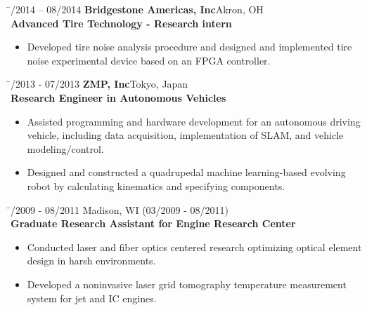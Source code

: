 \documentclass[11pt,letter]{article}
\begin{document}
\begin{tabbing}
	\hspace{3.5cm} \= /2014 -- 08/2014 \> {\bf Bridgestone Americas, Inc}\hfill{Akron, OH}\\
	\> {\bf Advanced Tire Technology - Research intern}\\
	\> \hspace{-2.5cm}\begin{minipage}{0.9\textwidth}
		\begin{itemize}
			\item Developed tire noise analysis procedure and designed and implemented tire noise experimental device based on an FPGA controller.
		\end{itemize}
	\end{minipage}
\end{tabbing}
\begin{tabbing}
	\hspace{3.5cm} \= /2013 - 07/2013 \> {\bf ZMP, Inc}\hfill{Tokyo, Japan }\\
	\> {\bf Research Engineer in Autonomous Vehicles}\\
	\> \hspace{-2.5cm} \begin{minipage}{0.9\textwidth}
		\begin{itemize}
			\item Assisted programming and hardware development for an autonomous driving vehicle, including data acquisition, implementation of SLAM, and vehicle modeling/control.
			\item Designed and constructed a quadrupedal machine learning-based evolving robot by calculating kinematics and specifying components.
		\end{itemize}
	\end{minipage}
\end{tabbing}
\begin{tabbing}
	\hspace{3.5cm} \= /2009 - 08/2011 \hfill{Madison, WI}{ (03/2009 - 08/2011)}\\
	 \> {\bf Graduate Research Assistant for Engine Research Center}\\
	 \> \hspace{-2.5cm}\begin{minipage}{0.9\textwidth}
	 	\begin{itemize}
	 		\item Conducted laser and fiber optics centered research optimizing optical element design in harsh environments.
	 		\item Developed a noninvasive laser grid tomography temperature measurement system for jet and IC engines.
	 	\end{itemize}
	 \end{minipage}
\end{tabbing}
\end{document}
